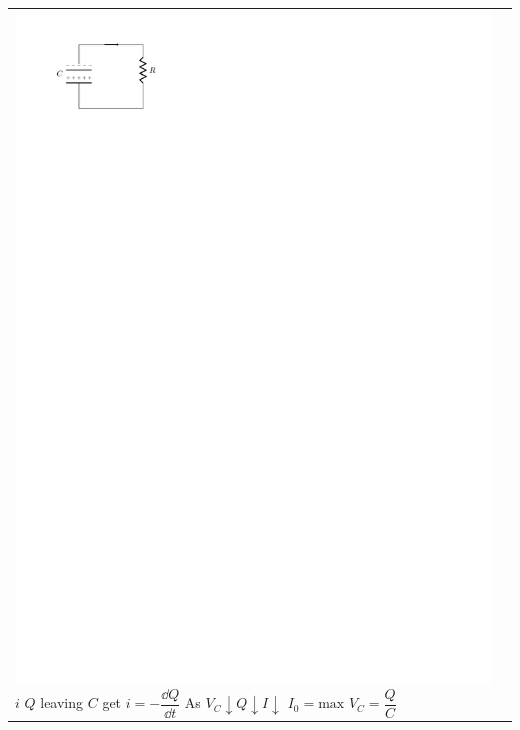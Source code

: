 \documentclass{article}
\begin{document}
\begin{tabularx}{\textwidth}{ X | X }
      \includegraphics{figures/capacitor-discharge-closed.pdf}\newline
      $i$\newline
      $Q$ leaving $C$ get $i=-\dfrac{\dd{Q}}{\dd{t}}$\newline
      As $V_C\downarrow Q\downarrow I\downarrow$\newline
      $I_0=\mathrm{max}$\newline
      $V_C=\dfrac{Q}{C}$
    \end{tabularx}
\end{document}
